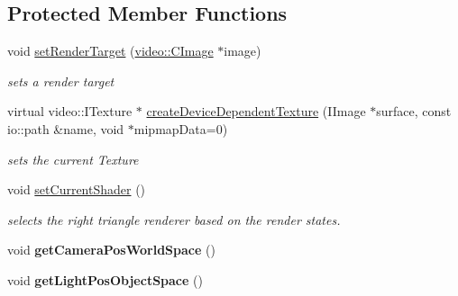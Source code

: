 \subsection*{Protected Member Functions}
\begin{DoxyCompactItemize}
\item 
\hypertarget{classirr_1_1video_1_1_c_burning_video_driver_a546d1ce2fcfb0d29b68f7ac8c59b09a0}{void \hyperlink{classirr_1_1video_1_1_c_burning_video_driver_a546d1ce2fcfb0d29b68f7ac8c59b09a0}{set\-Render\-Target} (\hyperlink{classirr_1_1video_1_1_c_image}{video\-::\-C\-Image} $\ast$image)}\label{classirr_1_1video_1_1_c_burning_video_driver_a546d1ce2fcfb0d29b68f7ac8c59b09a0}

\begin{DoxyCompactList}\small\item\em sets a render target \end{DoxyCompactList}\item 
virtual video\-::\-I\-Texture $\ast$ \hyperlink{classirr_1_1video_1_1_c_burning_video_driver_ad2ecf4a8d8564f7de6afaa40d1df5d7e}{create\-Device\-Dependent\-Texture} (I\-Image $\ast$surface, const io\-::path \&name, void $\ast$mipmap\-Data=0)
\begin{DoxyCompactList}\small\item\em sets the current Texture \end{DoxyCompactList}\item 
\hypertarget{classirr_1_1video_1_1_c_burning_video_driver_acd5f22bbb97336c1560ab4477831dc39}{void \hyperlink{classirr_1_1video_1_1_c_burning_video_driver_acd5f22bbb97336c1560ab4477831dc39}{set\-Current\-Shader} ()}\label{classirr_1_1video_1_1_c_burning_video_driver_acd5f22bbb97336c1560ab4477831dc39}

\begin{DoxyCompactList}\small\item\em selects the right triangle renderer based on the render states. \end{DoxyCompactList}\item 
\hypertarget{classirr_1_1video_1_1_c_burning_video_driver_a5fcd32cce6a54636c4597a38268de44f}{void {\bfseries get\-Camera\-Pos\-World\-Space} ()}\label{classirr_1_1video_1_1_c_burning_video_driver_a5fcd32cce6a54636c4597a38268de44f}

\item 
\hypertarget{classirr_1_1video_1_1_c_burning_video_driver_a955f3024070a552abcf9dd5ba37158e8}{void {\bfseries get\-Light\-Pos\-Object\-Space} ()}\label{classirr_1_1video_1_1_c_burning_video_driver_a955f3024070a552abcf9dd5ba37158e8}


\end{DoxyCompactItemize}
